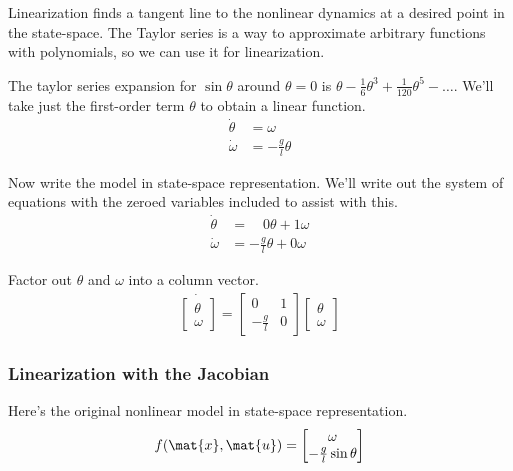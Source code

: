 Linearization finds a tangent line to the nonlinear dynamics at a desired point
in the state-space. The Taylor series is a way to approximate arbitrary
functions with polynomials, so we can use it for linearization.

The taylor series expansion for $\sin\theta$ around $\theta = 0$ is
$\theta - \frac{1}{6} \theta^3 + \frac{1}{120} \theta^5 - \ldots$. We'll take
just the first-order term $\theta$ to obtain a linear function.
\begin{align*}
  \dot{\theta} &= \omega \\
  \dot{\omega} &= -\frac{g}{l} \theta
\end{align*}

Now write the \gls{model} in state-space representation. We'll write out the
system of equations with the zeroed variables included to assist with this.
\begin{align*}
  \dot{\theta} &= \;\;\;\,0 \theta + 1 \omega \\
  \dot{\omega} &= -\frac{g}{l} \theta + 0 \omega
\end{align*}

Factor out $\theta$ and $\omega$ into a column vector.
\begin{align}
  \dot{
  \begin{bmatrix}
    \theta \\
    \omega
  \end{bmatrix}} =
  \begin{bmatrix}
    0 & 1 \\
    -\frac{g}{l} & 0
  \end{bmatrix}
  \begin{bmatrix}
    \theta \\
    \omega
  \end{bmatrix}
\end{align}

\subsubsection{Linearization with the Jacobian}

Here's the original nonlinear model in state-space representation.
\begin{equation*}
  f(\mat{x}, \mat{u}) =
  \begin{bmatrix}
    \omega \\
    -\frac{g}{l}\sin\theta
  \end{bmatrix}
\end{equation*}

